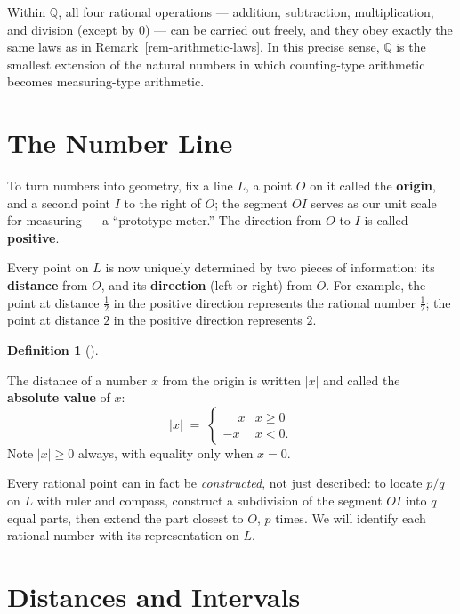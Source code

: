 \documentclass[
  letterpaper,
  DIV=11,
  numbers=noendperiod]{scrreprt}
\theoremstyle{plain}
\theoremstyle{plain}
\theoremstyle{definition}
\newtheorem{definition}{Definition}[chapter]
\theoremstyle{definition}
\theoremstyle{definition}
\theoremstyle{plain}
\theoremstyle{plain}
\theoremstyle{remark}
\begin{document}
Within \(\mathbb{Q}\), all four rational operations --- addition,
subtraction, multiplication, and division (except by \(0\)) --- can be
carried out freely, and they obey exactly the same laws as in
Remark~\ref{rem-arithmetic-laws}. In this precise sense, \(\mathbb{Q}\)
is the smallest extension of the natural numbers in which counting-type
arithmetic becomes measuring-type arithmetic.

\section{The Number Line}\label{the-number-line}

To turn numbers into geometry, fix a line \(L\), a point \(O\) on it
called the \textbf{origin}, and a second point \(I\) to the right of
\(O\); the segment \(OI\) serves as our unit scale for measuring --- a
``prototype meter.'' The direction from \(O\) to \(I\) is called
\textbf{positive}.

Every point on \(L\) is now uniquely determined by two pieces of
information: its \textbf{distance} from \(O\), and its
\textbf{direction} (left or right) from \(O\). For example, the point at
distance \(\tfrac12\) in the positive direction represents the rational
number \(\tfrac12\); the point at distance \(2\) in the positive
direction represents \(2\).

\begin{definition}[]\protect\hypertarget{def-absolute-value}{}\label{def-absolute-value}

\hfill\break
The distance of a number \(x\) from the origin is written \(|x|\) and
called the \textbf{absolute value} of \(x\): \[
|x| \;=\; \begin{cases} \phantom{-}x & x \ge 0 \\ -x & x < 0. \end{cases}
\] Note \(|x|\ge 0\) always, with equality only when \(x=0\).

\end{definition}

Every rational point can in fact be \emph{constructed}, not just
described: to locate \(p/q\) on \(L\) with ruler and compass, construct
a subdivision of the segment \(OI\) into \(q\) equal parts, then extend
the part closest to \(O\), \(p\) times. We will identify each rational
number with its representation on \(L\).

\section{Distances and Intervals}\label{distances-and-intervals}
\end{document}
